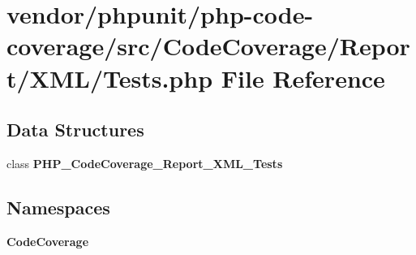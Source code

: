 \section{vendor/phpunit/php-\/code-\/coverage/src/\+Code\+Coverage/\+Report/\+X\+M\+L/\+Tests.php File Reference}
\label{_tests_8php}
\subsection*{Data Structures}
\begin{DoxyCompactItemize}
\item 
class {\bf P\+H\+P\+\_\+\+Code\+Coverage\+\_\+\+Report\+\_\+\+X\+M\+L\+\_\+\+Tests}
\end{DoxyCompactItemize}
\subsection*{Namespaces}
\begin{DoxyCompactItemize}
\item 
 {\bf Code\+Coverage}
\end{DoxyCompactItemize}
